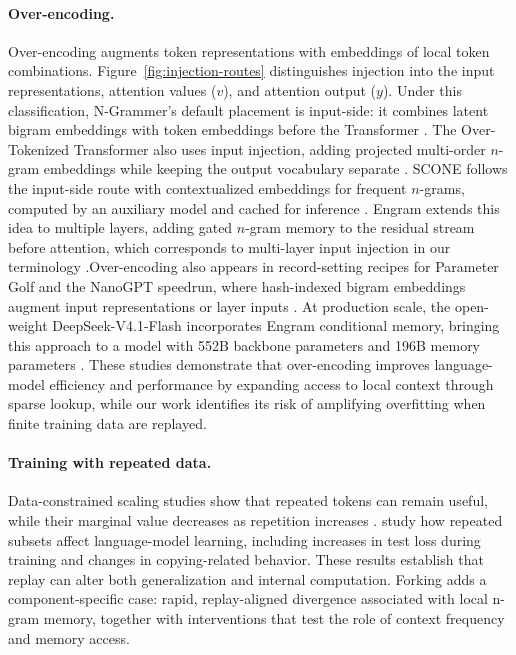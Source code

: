 \paragraph{Over-encoding.}
Over-encoding augments token representations with embeddings of local token combinations. Figure~\ref{fig:injection-routes} distinguishes injection into the input representations, attention values ($v$), and attention output ($y$). Under this classification, N-Grammer's default placement is input-side: it combines latent bigram embeddings with token embeddings before the Transformer \citep{roy2022ngrammer}. The Over-Tokenized Transformer also uses input injection, adding projected multi-order $n$-gram embeddings while keeping the output vocabulary separate \citep{huang2025over}. SCONE follows the input-side route with contextualized embeddings for frequent $n$-grams, computed by an auxiliary model and cached for inference \citep{yu2025scone}. Engram extends this idea to multiple layers, adding gated $n$-gram memory to the residual stream before attention, which corresponds to multi-layer input injection in our terminology \citep{cheng2026engram}.Over-encoding also appears in record-setting recipes for Parameter Golf and the NanoGPT speedrun, where hash-indexed bigram embeddings augment input representations or layer inputs \citep{openai2026parametergolf,shah2026bigramgolf,modded_nanogpt_2024}. At production scale, the open-weight DeepSeek-V4.1-Flash incorporates Engram conditional memory, bringing this approach to a model with 552B backbone parameters and 196B memory parameters \citep{deepseek2026v41flash}. These studies demonstrate that over-encoding improves language-model efficiency and performance by expanding access to local context through sparse lookup, while our work identifies its risk of amplifying overfitting when finite training data are replayed.

\paragraph{Training with repeated data.}
Data-constrained scaling studies show that repeated tokens can remain useful, while their marginal value decreases as repetition increases \citep{muennighoff2023scaling}. \citet{hernandez2022repeated} study how repeated subsets affect language-model learning, including increases in test loss during training and changes in copying-related behavior. These results establish that replay can alter both generalization and internal computation. Forking adds a component-specific case: rapid, replay-aligned divergence associated with local n-gram memory, together with interventions that test the role of context frequency and memory access.

